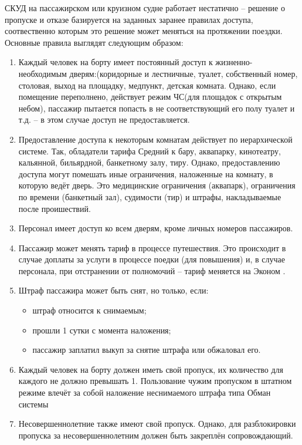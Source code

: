СКУД на пассажирском или круизном судне работает нестатично -- решение о пропуске и отказе базируется на заданных заранее правилах доступа, соотвественно которым это решение может меняться на протяжении поездки. Основные правила выглядят следующим образом:
\begin{enumerate}
	\item Каждый человек на борту имеет постоянный доступ к жизненно-необходимым дверям:(коридорные и лестничные, туалет, собственный номер, столовая, выход на площадку, медпункт, детская комната.
	Однако, если помещение переполнено, действует режим ЧС(для площадок с открытым небом), пассажир пытается попасть в не соответствующий его полу туалет и т.д. -- в этом случае доступ не предоставляется.
	\item Предоставление доступа к некоторым комнатам действует по иерархической системе. Так, обладатели тарифа \textquotedbl Средний \textquotedbl к бару, аквапарку, кинотеатру, кальянной, бильярдной, банкетному залу, тиру.
	Однако, предоставлению доступа могут помешать иные ограничения, наложенные на комнату, в которую ведёт дверь. Это медицинские ограничения (аквапарк), ограничения по времени (банкетный зал), судимости (тир) и штрафы, накладываемые после проишествий.
	\item Персонал имеет доступ ко всем дверям, кроме личных номеров пассажиров.
	\item Пассажир может менять тариф в процессе путешествия. Это происходит в случае доплаты за услуги в процессе поедки (для повышения) и, в случае персонала, при отстранении от полномочий -- тариф меняется на \textquotedbl Эконом \textquotedbl.
	\item Штраф пассажира может быть снят, но только, если:
	\begin{itemize}
		\item штраф относится к снимаемым;
		\item прошли 1 сутки с момента наложения;
		\item пассажир заплатил выкуп за снятие штрафа или обжаловал его.
	\end{itemize}
	\item Каждый человек на борту должен иметь свой пропуск, их количество для каждого не должно превышать 1. Пользование чужим пропуском в штатном режиме влечёт за собой наложение неснимаемого штрафа типа \textquotedbl Обман системы \textquotedbl
	\item Несовершеннолетние также имеют свой пропуск.
	Однако, для разблокировки пропуска за несовершеннолетним должен быть закреплён сопровождающий.

\end{enumerate}
